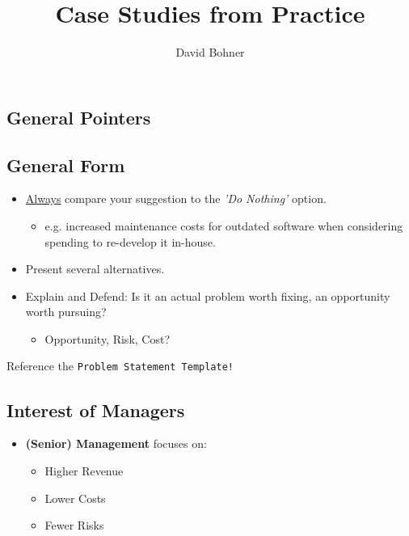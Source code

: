 \documentclass{sciposter}
\title{\huge{Case Studies from Practice}}
\author{David Bohner}
\newenvironment{important}{\begin{mdframed}[backgroundcolor=red!50,innertopmargin=15pt, innerbottommargin=15pt, nobreak=true]
		\Large
	}
	{ 
	\end{mdframed}
}
\begin{document}
\selectfont
\maketitle

\begin{multicols}{3}

\section{General Pointers}
\subsection{General Form}

\begin{mdframed}
\begin{itemize}
	\item \underline{Always} compare your suggestion to the \textit{'Do Nothing'} option.
	\begin{itemize}
		\item e.g. increased maintenance costs for outdated software when considering spending to re-develop it in-house.
	\end{itemize}
	\item Present several alternatives.
	\item Explain and Defend: Is it an actual problem worth fixing, an opportunity worth pursuing?
	\begin{itemize}
		\item Opportunity, Risk, Cost?
	\end{itemize}
\end{itemize}
\end{mdframed}

\begin{important}{}
Reference the \texttt{Problem Statement Template!}
\end{important}

\subsection{Interest of Managers}

\begin{mdframed}
\begin{itemize}
	\item \textbf{(Senior) Management} focuses on:
	\begin{itemize}
		\item Higher Revenue
		\item Lower Costs
		\item Fewer Risks
	\end{itemize}
\end{itemize}
\end{mdframed}


\end{multicols}
\end{document}
